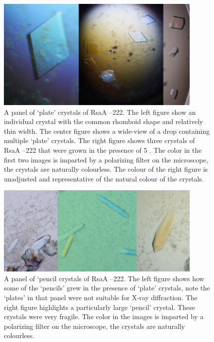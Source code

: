 \begin{figure}[htb]
  	\begin{center}
   		\includegraphics[width=0.9\textwidth]{crystal_chapter/img/goodxtal.jpg}
   	\end{center}
   	\caption[Panel of well diffracting `plate' crystals of RsaA --222]{A panel of `plate' crystals of RsaA --222. The left figure show an individual crystal with the common rhomboid shape and relatively thin width. The center figure shows a wide-view of a drop containing multiple `plate' crystals. The right figure shows three crystals of RsaA --222 that were grown in the presence of 5 \millimolar{} . The color in the first two images is imparted by a polarizing filter on the microscope, the crystals are naturally colourless. The colour of the right figure is unadjusted and representative of the natural colour of the crystals.}
   	\label{fig:crystal-panel}
\end{figure}   
\begin{figure}[htb]
  	\begin{center}
   		\includegraphics[width=0.9\textwidth]{crystal_chapter/img/pencils2.pdf}
   	\end{center}
   	\caption[A panel of `pencil crystals of RsaA --222']{A panel of `pencil crystals of RsaA --222. The left figure shows how some of the `pencils' grew in the presence of `plate' crystals, note the `plates' in that panel were not suitable for X-ray diffraction. The right figure highlights a particularly large `pencil' crystal. These crystals were very fragile.  The color in the images is imparted by a polarizing filter on the microscope, the crystals are naturally colourless.} 
   	\label{fig:pencils}
\end{figure}   

